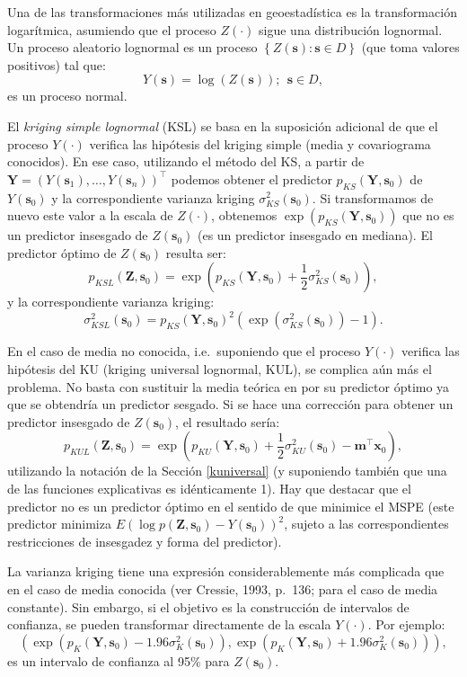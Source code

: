 \documentclass[
]{book}
\theoremstyle{break}
\theoremstyle{definition}
\theoremstyle{definition}
\theoremstyle{definition}
\theoremstyle{definition}
\theoremstyle{remark}
\begin{document}
Una de las transformaciones más utilizadas en geoestadística es la transformación logarítmica, asumiendo que el proceso \(Z(\cdot)\) sigue una distribución lognormal.
Un proceso aleatorio lognormal es un proceso \(\left\{ Z(\mathbf{s}):\mathbf{s}\in D\right\}\) (que toma valores positivos) tal que:
\[Y(\mathbf{s})=\log \left( Z(\mathbf{s})\right) ;\ \ \mathbf{s}\in D,\]
es un proceso normal.

El \emph{kriging simple lognormal} (KSL) se basa en la suposición adicional de que el proceso \(Y(\cdot)\) verifica las hipótesis del kriging simple (media y covariograma conocidos).
En ese caso, utilizando el método del KS, a partir de \(\mathbf{Y}=(Y(\mathbf{s}_{1}), \ldots,Y(\mathbf{s}_{n} ))^\top\) podemos obtener el predictor \(p_{KS} (\mathbf{Y},\mathbf{s}_{0})\) de \(Y(\mathbf{s}_{0})\) y la correspondiente varianza kriging \(\sigma_{KS}^{2} (\mathbf{s}_{0})\).
Si transformamos de nuevo este valor a la escala de \(Z(\cdot)\), obtenemos \(\exp (p_{KS} (\mathbf{Y},\mathbf{s}_{0}))\) que no es un predictor insesgado de \(Z(\mathbf{s}_{0})\) (es un predictor insesgado en mediana).
El predictor óptimo de \(Z(\mathbf{s}_{0})\) resulta ser:
\[p_{KSL} (\mathbf{Z},\mathbf{s}_{0}) = \exp \left( p_{KS}(\mathbf{Y},\mathbf{s}_{0}) + \frac{1}{2} \sigma_{KS}^{2}(\mathbf{s}_{0}) \right),\]
y la correspondiente varianza kriging:
\[\sigma_{KSL}^{2} (\mathbf{s}_{0})=p_{KS} (\mathbf{Y},\mathbf{s}_{0}
)^{2} \left( \exp (\sigma_{KS}^{2} (\mathbf{s}_{0}))-1\right).\]

En el caso de media no conocida, i.e.~suponiendo que el proceso \(Y(\cdot)\) verifica las hipótesis del KU (kriging universal lognormal, KUL), se complica aún más el problema.
No basta con sustituir la media teórica en por su predictor óptimo ya que se obtendría un predictor sesgado.
Si se hace una corrección para obtener un predictor insesgado de \(Z(\mathbf{s}_{0})\), el resultado sería:
\[p_{KUL} (\mathbf{Z},\mathbf{s}_{0}) = \exp \left( p_{KU}(\mathbf{Y},\mathbf{s}_{0}) + \frac{1}{2} \sigma_{KU}^{2}(\mathbf{s}_{0}) - \mathbf{m^\top }\mathbf{x}_0\right),\]
utilizando la notación de la Sección \ref{kuniversal} (y suponiendo también que una de las funciones explicativas es idénticamente 1).
Hay que destacar que el predictor no es un predictor óptimo en el sentido de que minimice el MSPE (este predictor minimiza \(E\left( \log p(\mathbf{Z},\mathbf{s}_{0})-Y(\mathbf{s}_{0})\right)^2\), sujeto a las correspondientes restricciones de insesgadez y forma del predictor).

La varianza kriging tiene una expresión considerablemente más complicada que en el caso de media conocida (ver Cressie, 1993, p.~136; para el caso de media constante).
Sin embargo, si el objetivo es la construcción de intervalos de confianza, se pueden transformar directamente de la escala \(Y(\cdot)\).
Por ejemplo:
\[\left( \exp \left( p_{K} (\mathbf{Y},\mathbf{s}_{0}) - 1.96\sigma_{K}^{2}(\mathbf{s}_{0}) \right), \exp \left( p_{K} (\mathbf{Y},\mathbf{s}_{0}) + 1.96\sigma_{K}^{2} (\mathbf{s}_{0})\right) \right),\]
es un intervalo de confianza al 95\% para \(Z(\mathbf{s}_{0})\).
\end{document}
